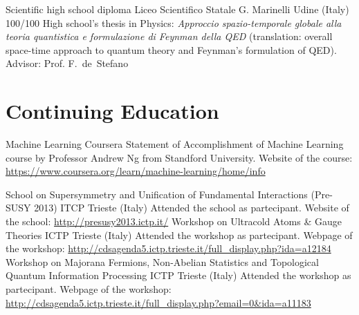 \documentclass[10pt,a4paper]{moderncv}   %
\begin{document}
{Scientific high school diploma} 
{Liceo Scientifico Statale G. Marinelli}
{Udine (Italy)}
{100/100}
{High school's thesis in Physics: \emph{Approccio spazio-temporale globale alla
      teoria quantistica e formulazione di Feynman della QED} (translation:
   overall space-time approach to quantum theory and Feynman's formulation of
   QED). Advisor: Prof.
   F.~de~Stefano}
 

\section{Continuing Education}


{Machine Learning}
{Coursera}
{}
{}
{Statement of Accomplishment of Machine Learning course by Professor Andrew Ng
   from Standford University.
   Website of the course:
   \url{https://www.coursera.org/learn/machine-learning/home/info}}


{School on Supersymmetry and Unification of Fundamental Interactions (Pre-SUSY
   2013)}
{ITCP}
{Trieste (Italy)}
{}
{Attended the 
  school
   as partecipant. Website of the school:
   \url{http://presusy2013.ictp.it/}}
{Workshop on Ultracold Atoms \& Gauge
   Theories}
{ICTP}
{Trieste (Italy)}{}
{Attended 
   the workshop as
   partecipant.
   Webpage of the workshop:
   \url{http://cdsagenda5.ictp.trieste.it/full_display.php?ida=a12184}}
{Workshop on Majorana Fermions, Non-Abelian Statistics and Topological Quantum Information Processing}%
{ICTP}
{Trieste (Italy)}
{}
{Attended 
   the workshop 
   as
   partecipant. 
   Webpage of the workshop:
   \url{http://cdsagenda5.ictp.trieste.it/full_display.php?email=0&ida=a11183}}
\end{document}

